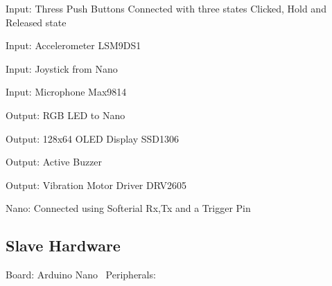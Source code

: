 \begin{DoxyEnumerate}
\item Input\+: Thress Push Buttons Connected with three states Clicked, Hold and Released state~\newline

\item Input\+: Accelerometer L\+S\+M9\+D\+S1~\newline

\item Input\+: Joystick from Nano~\newline

\item Input\+: Microphone Max9814~\newline

\item Output\+: R\+GB L\+ED to Nano~\newline

\item Output\+: 128x64 O\+L\+ED Display S\+S\+D1306~\newline

\item Output\+: Active Buzzer~\newline

\item Output\+: Vibration Motor Driver D\+R\+V2605~\newline

\item Nano\+: Connected using Softerial Rx,Tx and a Trigger Pin
\end{DoxyEnumerate}\hypertarget{index_hw_sec2}{}\subsection{Slave Hardware}\label{index_hw_sec2}
Board\+: Arduino Nano~\newline
Peripherals\+: ~\newline

